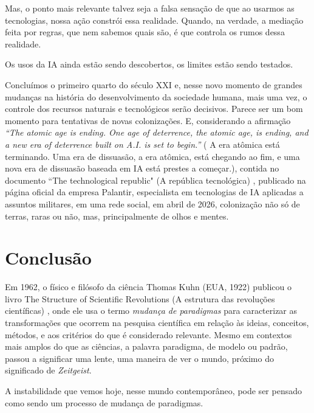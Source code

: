\documentclass{hipatia}
\begin{document}
Mas, o ponto mais relevante talvez seja a falsa sensação de que ao usarmos as tecnologias, nossa ação constrói essa realidade. Quando, na verdade, a mediação feita por regras, que nem sabemos quais são, é que controla os rumos dessa realidade.

Os usos da IA ainda estão sendo descobertos, os limites estão sendo testados.

Concluímos o primeiro quarto do século XXI e, nesse novo momento de grandes mudanças na história do desenvolvimento da sociedade humana, mais uma vez, o controle dos recursos naturais e tecnológicos serão decisivos. Parece ser um bom momento para tentativas de novas colonizações. E, considerando a afirmação \textit{``The atomic age is ending. One age of deterrence, the atomic age, is ending, and a new era of deterrence built on A.I. is set to begin.''} ( A era atômica está terminando. Uma era de dissuasão, a era atômica, está chegando ao fim, e uma nova era de dissuasão baseada em IA está prestes a começar.), contida no documento ``The technological republic" (A república tecnológica) \cite{Palantir2026}, publicado na página oficial da empresa Palantir, especialista em tecnologias de IA aplicadas a assuntos militares, em uma rede social, em abril de 2026,  colonização não só de terras, raras ou não, mas, principalmente de olhos e mentes.









\section{Conclusão}

Em 1962, o físico e filósofo da ciência Thomas Kuhn (EUA, 1922) publicou o livro The Structure of Scientific Revolutions (A estrutura das revoluções científicas) \cite{Kuhn2017}, onde ele usa o termo \textit{mudança de paradigmas} para caracterizar as transformações que ocorrem na pesquisa científica em relação às ideias, conceitos, métodos, e aos critérios do que é considerado relevante. Mesmo em contextos mais amplos do que as ciências, a palavra paradigma, de modelo ou padrão, passou a significar uma lente, uma maneira de ver o mundo, próximo do significado de \textit{Zeitgeist}.

	A instabilidade que vemos hoje, nesse mundo contemporâneo, pode ser pensado como sendo um processo de mudança de paradigmas.
\end{document}
